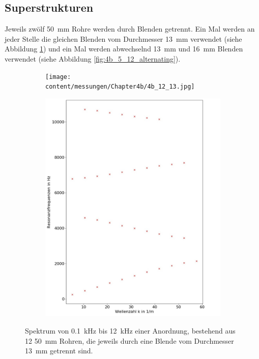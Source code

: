 \subsection{Superstrukturen}
\label{subsec:Superstrukturen}
Jeweils zwölf 50~mm Rohre werden durch Blenden getrennt. 
Ein Mal werden an jeder Stelle die gleichen Blenden vom Durchmesser 13~mm verwendet (siehe Abbildung \ref{fig:4b_5_12}) und ein Mal werden abwechselnd 13~mm und 16~mm Blenden verwendet (siehe Abbildung \ref{fig:4b_5_12_alternating}).
\begin{figure}
\centering
\begin{subfigure}{0.65\textwidth}
\texttt{[image: content/messungen/Chapter4b/4b\_12\_13.jpg]}
\end{subfigure}
\begin{subfigure}{0.34\textwidth}
\includegraphics[width=\textwidth]{content/Scripts/4b_5_red.jpg}
\end{subfigure}
\caption{Spektrum von 0.1~kHz bis 12~kHz einer Anordnung, bestehend aus 12 50~mm Rohren, die jeweils durch eine Blende vom Durchmesser 13~mm getrennt sind.}
\label{fig:4b_5_12}
\end{figure}
